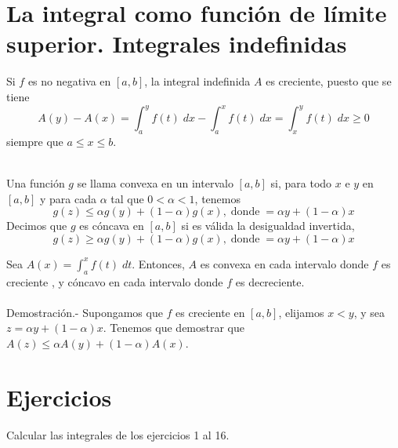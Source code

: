 \section{La integral como función de límite superior. Integrales indefinidas}

Si $f$ es no negativa en $[a,b]$, la integral indefinida $A$ es creciente, puesto que se tiene
$$A(y)-A(x)=\int_a^y f(t)\; dx - \int_a^x f(t)\; dx = \int_x^y f(t)\; dx \geq 0$$
siempre que $a\leq x \leq b.$\\\\

    \begin{def.} Una función $g$ se llama convexa en un intervalo $[a,b]$ si, para todo $x$ e $y$ en $[a,b]$ y para cada $\alpha$ tal que $0<\alpha<1$, tenemos 
	$$g(z)\leq \alpha g(y) + (1-\alpha)g(x),\; \mbox{donde}\; =\alpha y + (1-\alpha)x$$
	Decimos que $g$ es cóncava en $[a,b]$ si es válida la desigualdad invertida,
	$$g(z)\geq \alpha g(y) + (1-\alpha)g(x),\; \mbox{donde}\; =\alpha y + (1-\alpha)x$$
    \end{def.}

\begin{teo}
    Sea $A(x) =\int_a^x f(t)\; dt$. Entonces, $A$ es convexa en cada intervalo donde $f$ es creciente , y cóncavo en cada intervalo donde $f$ es decreciente.\\\\
    Demostración.-\; Supongamos que $f$ es creciente en $[a,b]$, elijamos $x<y$,  y sea $z=\alpha y + (1-\alpha)x.$ Tenemos que demostrar que $A(z)\leq \alpha A(y)+(1-\alpha)A(x)$. 
\end{teo}




\section{Ejercicios}

Calcular las integrales de los ejercicios 1 al 16.\\\\

